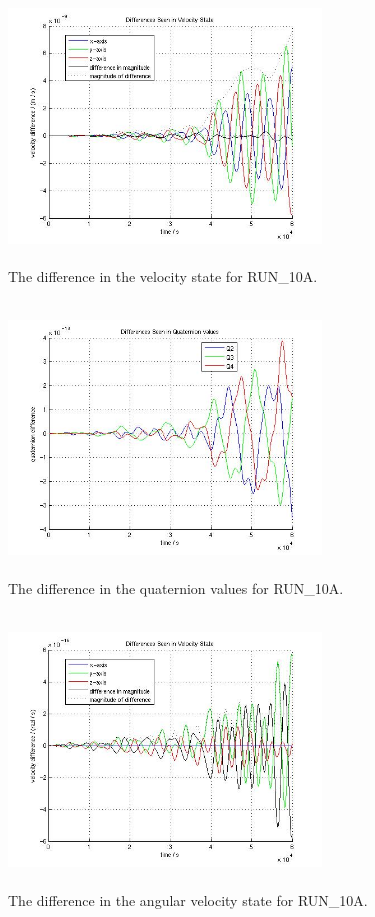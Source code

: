 \begin{description}
\begin{figure}[htp]
\begin{center}
\includegraphics[width=3.2736in,height=2.85in]{figures/run_10avel.jpg}
\caption{The difference in the velocity state for RUN\_10A.}
\label{fig:sim710avel}
\end{center}
\end{figure}

\begin{figure}[htp]
\begin{center}
\includegraphics[width=3.2736in,height=2.85in]{figures/run_10aquat.jpg}
\caption{The difference in the quaternion values for RUN\_10A.}
\label{fig:sim710aquat}
\end{center}
\end{figure}

\begin{figure}[htp]
\begin{center}
\includegraphics[width=3.2736in,height=2.85in]{figures/run_10aangvel.jpg}
\caption{The difference in the angular velocity state for RUN\_10A.}
\label{fig:sim710aavel}
\end{center}
\end{figure}

\end{description}
